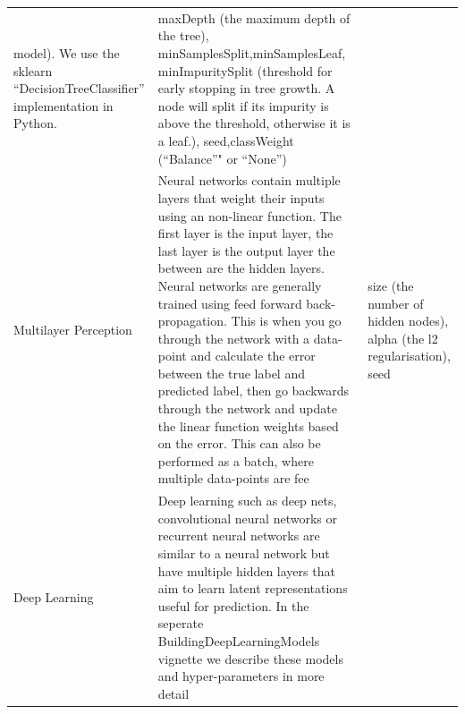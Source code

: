 \documentclass[]{article}
\begin{document}
\begin{longtable}[]{@{}lll@{}}
\begin{minipage}[t]{0.55\columnwidth}
model). We use the sklearn ``DecisionTreeClassifier'' implementation in
Python.\strut
\end{minipage} & \begin{minipage}[t]{0.25\columnwidth}\raggedright\strut
maxDepth (the maximum depth of the tree),
minSamplesSplit,minSamplesLeaf, minImpuritySplit (threshold for early
stopping in tree growth. A node will split if its impurity is above the
threshold, otherwise it is a leaf.), seed,classWeight (``Balance''" or
``None'')\strut
\end{minipage}\tabularnewline
\begin{minipage}[t]{0.12\columnwidth}\raggedright\strut
Multilayer Perception\strut
\end{minipage} & \begin{minipage}[t]{0.55\columnwidth}\raggedright\strut
Neural networks contain multiple layers that weight their inputs using
an non-linear function. The first layer is the input layer, the last
layer is the output layer the between are the hidden layers. Neural
networks are generally trained using feed forward back-propagation. This
is when you go through the network with a data-point and calculate the
error between the true label and predicted label, then go backwards
through the network and update the linear function weights based on the
error. This can also be performed as a batch, where multiple data-points
are fee\strut
\end{minipage} & \begin{minipage}[t]{0.25\columnwidth}\raggedright\strut
size (the number of hidden nodes), alpha (the l2 regularisation),
seed\strut
\end{minipage}\tabularnewline
\begin{minipage}[t]{0.12\columnwidth}\raggedright\strut
Deep Learning\strut
\end{minipage} & \begin{minipage}[t]{0.55\columnwidth}\raggedright\strut
Deep learning such as deep nets, convolutional neural networks or
recurrent neural networks are similar to a neural network but have
multiple hidden layers that aim to learn latent representations useful
for prediction. In the seperate BuildingDeepLearningModels vignette we
describe these models and hyper-parameters in more detail\strut
\end{minipage} & \begin{minipage}[t]{0.25\columnwidth}\raggedright\strut
\strut
\end{minipage}\tabularnewline
\bottomrule
\end{longtable}
\end{document}
